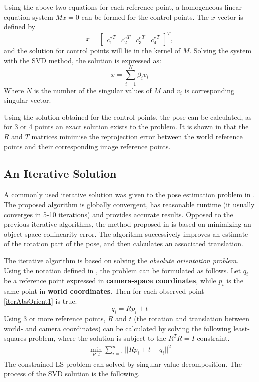 Using the above two equations for each reference point, a homogeneous linear equation system $Mx = 0$ can be formed for the control points.
The $x$ vector is defined by
\begin{equation}
x = 
	\begin{bmatrix}
		{c_1^c}^T & {c_2^c}^T & {c_3^c}^T & {c_4^c}^T
	\end{bmatrix}^T,
\end{equation}
and the solution for control points will lie in the kernel of $M$.
Solving the system with the SVD method, the solution is expressed as:
\begin{equation}
	x = \sum_{i=1}^{N} \beta_i v_i
\end{equation}
Where $N$ is the number of the singular values of $M$ and $v_i$ is corresponding singular vector.

Using the solution obtained for the control points, the pose can be calculated, as for 3 or 4 points an exact solution exists to the problem.
It is shown in \cite{Lepetit2008} that the $R$ and $T$ matrices minimise the reprojection error between the world reference points and their corresponding image reference points.

\subsection{An Iterative Solution}

A commonly used iterative solution was given to the pose estimation problem in \cite{iterative}.
The proposed algorithm is globally convergent, has reasonable runtime (it usually converges in 5-10 iterations) and provides accurate results.
Opposed to the previous iterative algorithms, the method proposed in \cite{iterative} is based on minimizing an object-space collinearity error.
The algorithm successively improves an estimate of the rotation part of the pose, and then calculates an associated translation.

The iterative algorithm is based on solving the \textit{absolute orientation problem}.
Using the notation defined in \cite{iterative}, the problem can be formulated as follows.
Let $q_i$ be a reference point expressed in \textbf{camera-space coordinates}, while $p_i$ is the same point in \textbf{world coordinates}.
Then for each observed point \eqref{iterAbsOrient1} is true.
\begin{equation}
	q_i = R p_i + t
	\label{eq:iterAbsOrient1}
\end{equation}
Using 3 or more reference points, $R$ and $t$ (the rotation and translation between world- and camera coordinates) can be calculated by solving the following least-squares problem\cite{iterative}, where the solution is subject to the $R^TR = I$ constraint.
\begin{align}
	\min_{R,t} \sum_{i=1}^{n} ||R p_i + t - q_i ||^2
	\label{eq:iterLSProb}
\end{align}
The constrained LS problem can solved by singular value decomposition.
The process of the SVD solution is the following.

